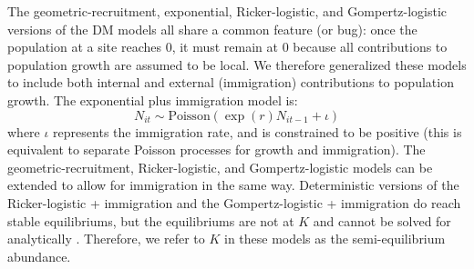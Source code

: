 \documentclass[12pt]{article}
\begin{document}
The geometric-recruitment, exponential, Ricker-logistic, and Gompertz-logistic
versions of the DM models all share a common feature (or bug):
once the population at a site reaches 0, it must remain at 0
because all contributions to population growth are assumed to be
local.  We therefore generalized these models to
include both internal and external (immigration) contributions
to population growth.  The exponential plus immigration
model is:
\begin{equation}
  N_{it} \sim \text{Poisson}(\exp(r)N_{it-1} + \iota)
  \label{eq:expimm2}
\end{equation}
where $\iota$ represents the immigration rate, and is
constrained to be
positive (this is equivalent to separate Poisson processes for
growth and immigration).  %
The geometric-recruitment, Ricker-logistic,
and Gompertz-logistic models can be extended to allow for immigration in the
same way.   Deterministic versions of the Ricker-logistic + immigration and the 
Gompertz-logistic + immigration do reach stable equilibriums, but the equilibriums 
are not at $K$ and cannot be solved for analytically \citep{otto_day:2007}.  Therefore, we
refer to $K$ in these models as the semi-equilibrium abundance.

\end{document}
